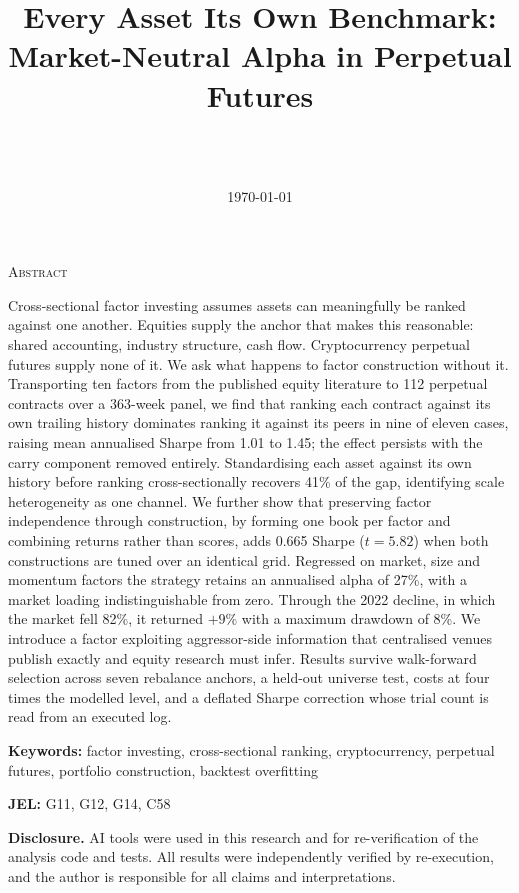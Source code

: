 \documentclass[11pt,letterpaper]{article}
\title{\textbf{Every Asset Its Own Benchmark:\\[2pt]
Market-Neutral Alpha in Perpetual Futures}}
\author{\AUTHORNAME\\ \small \AUTHORAFFIL\\ \small \texttt{\AUTHOREMAIL}}
\date{\vspace{-6pt}\small \today}
\newenvironment{adjustwidth}%
  {\list{}{\leftmargin=0.09\textwidth \rightmargin=0.09\textwidth \listparindent=1em \itemindent=0pt \parsep=0.5em}\item[]}%
  {\endlist}
\begin{document}
\maketitle
\vspace{-14pt}

\begin{center}
{\scshape Abstract}
\end{center}
\vspace{-4pt}
\begin{adjustwidth}
\singlespacing\small\noindent
Cross-sectional factor investing assumes assets can meaningfully be ranked
against one another. Equities supply the anchor that makes this reasonable:
shared accounting, industry structure, cash flow. Cryptocurrency perpetual
futures supply none of it. We ask what happens to factor construction without it. Transporting ten factors
from the published equity literature to 112 perpetual contracts over a 363-week
panel, we find that ranking each contract against its own trailing history
dominates ranking it against its peers in nine of eleven cases, raising mean
annualised Sharpe from 1.01 to 1.45; the effect persists with the carry component
removed entirely. Standardising each asset against its own history before ranking
cross-sectionally recovers 41\% of the gap, identifying scale heterogeneity as one
channel. We further show that
preserving factor independence through construction, by forming one book per factor
and combining returns rather than scores, adds 0.665 Sharpe ($t=5.82$) when both
constructions are tuned over an identical grid. Regressed on market, size and
momentum factors the strategy retains an annualised alpha of 27\%, with a market
loading indistinguishable from zero. Through the 2022 decline, in which the
market fell 82\%, it returned $+9\%$ with a maximum drawdown of 8\%. We introduce a factor exploiting aggressor-side information that
centralised venues publish exactly and equity research must infer. Results
survive walk-forward selection across seven rebalance anchors, a held-out
universe test, costs at four times the modelled level, and a deflated Sharpe
correction whose trial count is read from an executed log.

\vspace{6pt}
\noindent\textbf{Keywords:} factor investing, cross-sectional ranking,
cryptocurrency, perpetual futures, portfolio construction, backtest overfitting

\vspace{2pt}
\noindent\textbf{JEL:} G11, G12, G14, C58

\vspace{4pt}
\noindent\textbf{Disclosure.} AI tools were used in this research and for
re-verification of the analysis code and tests. All
results were independently verified by re-execution, and the author is
responsible for all claims and interpretations.

\end{adjustwidth}
\normalsize
\onehalfspacing
\end{document}
